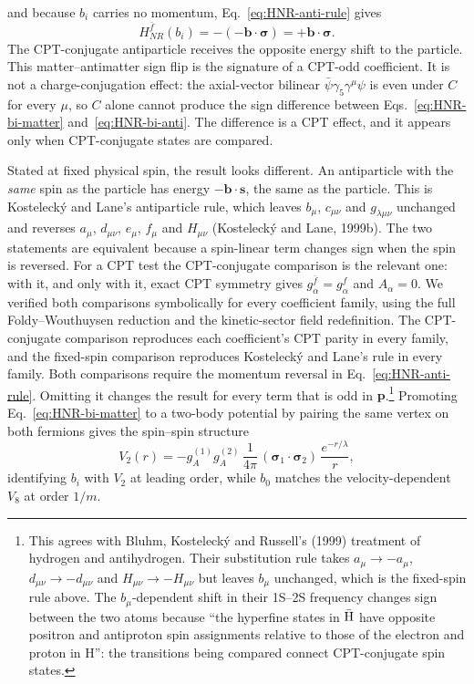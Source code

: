 and because $b_i$ carries no momentum, Eq.~\eqref{eq:HNR-anti-rule} gives
\begin{equation}
  H_{NR}^{\bar f}(b_i) = -\left(-\mathbf b\cdot\boldsymbol\sigma\right)
  = +\mathbf b\cdot\boldsymbol\sigma. \label{eq:HNR-bi-anti}
\end{equation}
The CPT-conjugate antiparticle receives the opposite energy shift to the
particle. This matter--antimatter sign flip is the signature of a CPT-odd
coefficient. It is not a charge-conjugation effect:
the axial-vector bilinear $\bar\psi\gamma_5\gamma^\mu\psi$ is even under $C$
for every $\mu$, so $C$ alone cannot produce the sign difference between
Eqs.~\eqref{eq:HNR-bi-matter} and~\eqref{eq:HNR-bi-anti}. The difference
is a CPT effect, and it appears only when CPT-conjugate states are
compared.

Stated at fixed physical spin, the result looks different. An antiparticle with
the \emph{same} spin as the particle has energy $-\mathbf b\cdot\mathbf s$,
the same as the particle. This is Kostelecký and Lane's antiparticle
rule, which leaves $b_\mu$, $c_{\mu\nu}$ and $g_{\lambda\mu\nu}$ unchanged
and reverses $a_\mu$, $d_{\mu\nu}$, $e_\mu$, $f_\mu$ and $H_{\mu\nu}$
(Kostelecký and Lane, 1999b). The two statements are equivalent because a
spin-linear term changes sign when the spin is reversed. For a CPT test
the CPT-conjugate comparison is the relevant one: with it, and only with
it, exact CPT symmetry gives $g^{\bar f}_\alpha=g^{f}_\alpha$ and
$A_\alpha=0$. We verified both comparisons symbolically for every
coefficient family, using the full Foldy--Wouthuysen reduction and the
kinetic-sector field redefinition. The CPT-conjugate comparison reproduces
each coefficient's CPT parity in every family, and the fixed-spin
comparison reproduces Kostelecký and Lane's rule in every family. Both
comparisons require the momentum reversal in
Eq.~\eqref{eq:HNR-anti-rule}. Omitting it changes the result for every
term that is odd in $\mathbf p$.\footnote{This agrees with Bluhm,
Kosteleck\'y and Russell's (1999) treatment of hydrogen and antihydrogen.
Their substitution rule takes $a_\mu\to-a_\mu$, $d_{\mu\nu}\to-d_{\mu\nu}$
and $H_{\mu\nu}\to-H_{\mu\nu}$ but leaves $b_\mu$ unchanged, which is the
fixed-spin rule above. The $b_\mu$-dependent shift in their 1S--2S
frequency changes sign between the two atoms because ``the hyperfine states
in $\bar{\rm H}$ have opposite positron and antiproton spin assignments
relative to those of the electron and proton in H'': the transitions being
compared connect CPT-conjugate spin states.}
Promoting
Eq.~\eqref{eq:HNR-bi-matter} to a
two-body potential by pairing the same vertex on both fermions gives the
spin--spin structure
\begin{equation}
  V_2(r) = -g_A^{(1)}g_A^{(2)}\,\frac{1}{4\pi}\,
  (\boldsymbol\sigma_1\cdot\boldsymbol\sigma_2)\,\frac{e^{-r/\lambda}}{r},
  \label{eq:V2-final}
\end{equation}
identifying $b_i$ with $V_2$ at leading order, while $b_0$ matches the
velocity-dependent $V_8$ at order $1/m$.

